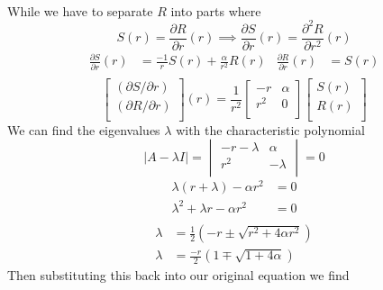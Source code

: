 \documentclass{article}
\begin{document}
\paragraph{}
While we have to separate $R$ into parts where
\[ S(r) = \frac{\partial R}{\partial r} (r) \implies \frac{\partial S}{\partial r} (r) =  \frac{\partial^{2} R}{\partial r^{2}} (r) \]
\begin{align*}
\frac{\partial S}{\partial r}(r) &= \frac{-1}{r} S(r) + \frac{\alpha}{r^{2}} R(r)
&
\frac{\partial R}{\partial r} (r) &= S(r)\\
\end{align*}
\[
\boxed{\begin{bmatrix}
(\partial S/\partial r) \\
(\partial R/\partial r) \\
\end{bmatrix}
(r) = 
\frac{1}{r^{2}}
\begin{bmatrix}
-r	&	\alpha	\\
r^{2}	&	0	\\
\end{bmatrix}
\begin{bmatrix}
S(r)	\\
R(r)	\\
\end{bmatrix}}
\]
We can find the eigenvalues $\lambda$ with the characteristic polynomial
\[ |A-\lambda I| = \begin{vmatrix}
-r - \lambda	&	\alpha		\\
r^{2}			&	-\lambda	\\
\end{vmatrix} = 0 \]
\begin{align*}
\lambda(r + \lambda) - \alpha r^{2} &= 0\\
\lambda^{2} + \lambda r - \alpha r^{2} &= 0\\
\end{align*}
\begin{align*}
\lambda &= \frac{1}{2}\left( -r \pm \sqrt{r^{2} + 4\alpha r^{2}} \right)\\
\lambda &= \boxed{\frac{-r}{2}\left( 1 \mp \sqrt{1 + 4\alpha} \right)}
\end{align*}
Then substituting this back into our original equation we find
\end{document}
